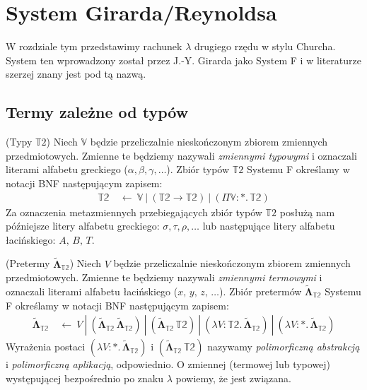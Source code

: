 \section{System Girarda/Reynoldsa}\label{sec:system_f}
W rozdziale tym przedstawimy rachunek \(\lambda\) drugiego rzędu w stylu Churcha. System ten wprowadzony został przez J.-Y.  Girarda jako System F i w literaturze szerzej znany jest pod tą nazwą. 

\subsection{Termy zależne od typów}

\begin{definicja}(Typy \(\mathbb{T}2\))
  Niech \(\mathbb{V}\) będzie przeliczalnie nieskończonym zbiorem zmiennych przedmiotowych. Zmienne te będziemy nazywali \emph{zmiennymi typowymi} i oznaczali literami alfabetu greckiego (\(\alpha, \beta, \gamma, \dots\)). Zbiór typów \(\mathbb{T}2\) Systemu F określamy w notacji BNF następującym zapisem:
  \begin{align*}
    \mathbb{T2}\ &\leftarrow\ \mathbb{V}\ |\ (\mathbb{T2}\to\mathbb{T2})\ |\ (\Pi \mathbb{V}:*.\,\mathbb{T2})
  \end{align*}
Za oznaczenia metazmiennych przebiegających zbiór typów \(\mathbb{T}2\) posłużą nam późniejsze litery alfabetu greckiego: \(\sigma,\tau,\rho,\dots\) lub następujące litery alfabetu łacińskiego: \(A,\, B,\, T\).
\end{definicja}
\begin{definicja}(Pretermy \(\mathbf{\tilde\Lambda}_\mathbb{T2}\))
  Niech \(V\) będzie przeliczalnie nieskończonym zbiorem zmiennych przedmiotowych. Zmienne te będziemy nazywali \emph{zmiennymi termowymi} i oznaczali literami alfabetu łacińskiego (\(x,\, y,\, z,\,\dots\)). Zbiór pretermów \(\mathbf{\tilde\Lambda}_\mathbb{T2}\) Systemu F określamy w notacji BNF następującym zapisem:
  \begin{align*}
      \mathbf{\tilde\Lambda}_\mathbb{T2}\ &\leftarrow \ V\ |\ (\mathbf{\tilde\Lambda}_\mathbb{T2}\,\mathbf{\tilde\Lambda}_\mathbb{T2}) \ |\ (\mathbf{\tilde\Lambda}_\mathbb{T2}\,\mathbb{T2}) \ |\ (\lambda V:\mathbb{T2}.\, \mathbf{\tilde\Lambda}_\mathbb{T2})\ |\ (\lambda V:*.\, \mathbf{\tilde\Lambda}_\mathbb{T2})
  \end{align*}
  Wyrażenia postaci \((\lambda V:*.\, \mathbf{\tilde\Lambda}_\mathbb{T2})\) i \((\mathbf{\tilde\Lambda}_\mathbb{T2}\,\mathbb{T2})\) nazywamy \emph{polimorficzną abstrakcją} i \emph{polimorficzną aplikacją}, odpowiednio. O zmiennej (termowej lub typowej) występującej bezpośrednio po znaku \(\lambda\) powiemy, że jest związana.  
\end{definicja}

